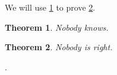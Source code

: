 \documentclass{article}
\newtheorem{theorem}{Theorem}
\begin{document}
We will use \cref{a} to prove \cref{b}.
\begin{theorem}\label{a}Nobody knows.\end{theorem}
\begin{theorem}\label{b}Nobody is right.\end{theorem}.
\end{document}
